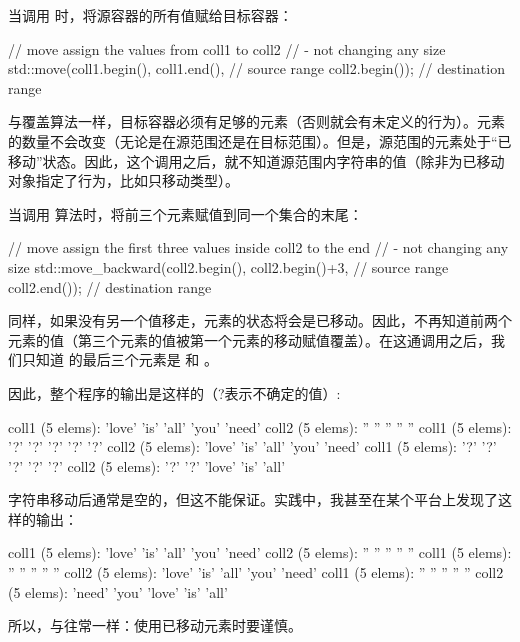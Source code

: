 当调用  时，将源容器的所有值赋给目标容器：

\begin{cppcode}
// move assign the values from coll1 to coll2
// - not changing any size
std::move(coll1.begin(), coll1.end(), // source range
		  coll2.begin()); // destination range
\end{cppcode}

与覆盖算法一样，目标容器必须有足够的元素（否则就会有未定义的行为）。元素的数量不会改变（无论是在源范围还是在目标范围）。但是，源范围的元素处于“已移动”状态。因此，这个调用之后，就不知道源范围内字符串的值（除非为已移动对象指定了行为，比如只移动类型）。

当调用  算法时，将前三个元素赋值到同一个集合的末尾：

\begin{cppcode}
// move assign the first three values inside coll2 to the end
// - not changing any size
std::move_backward(coll2.begin(), coll2.begin()+3, // source range
				   coll2.end()); // destination range
\end{cppcode}

同样，如果没有另一个值移走，元素的状态将会是已移动。因此，不再知道前两个元素的值（第三个元素的值被第一个元素的移动赋值覆盖）。在这通调用之后，我们只知道  的最后三个元素是  和 。

因此，整个程序的输出是这样的（?表示不确定的值）:

\begin{outputcode}
coll1 (5 elems): 'love' 'is' 'all' 'you' 'need'
coll2 (5 elems): '' '' '' '' ''
coll1 (5 elems): '?' '?' '?' '?' '?'
coll2 (5 elems): 'love' 'is' 'all' 'you' 'need'
coll1 (5 elems): '?' '?' '?' '?' '?'
coll2 (5 elems): '?' '?' 'love' 'is' 'all'
\end{outputcode}

字符串移动后通常是空的，但这不能保证。实践中，我甚至在某个平台上发现了这样的输出：

\begin{outputcode}
coll1 (5 elems): 'love' 'is' 'all' 'you' 'need'
coll2 (5 elems): '' '' '' '' ''
coll1 (5 elems): '' '' '' '' ''
coll2 (5 elems): 'love' 'is' 'all' 'you' 'need'
coll1 (5 elems): '' '' '' '' ''
coll2 (5 elems): 'need' 'you' 'love' 'is' 'all'
\end{outputcode}


所以，与往常一样：使用已移动元素时要谨慎。


